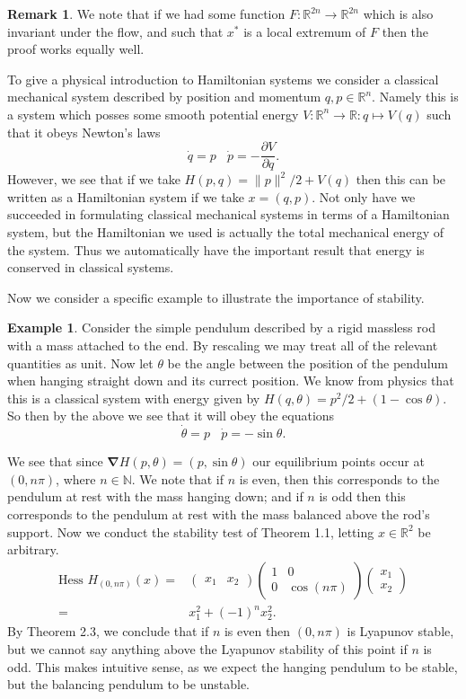 \documentclass[psamsfonts,12pt]{amsart}
\newcommand\0{\mathbf{0}}
\newcommand\grad{\boldsymbol{\nabla}}
\theoremstyle{plain}
\theoremstyle{definition}
\newtheorem{ex}[thm]{Example} %
\newtheorem{rmk}[thm]{Remark}
\newcommand{\bbN}{\mathbb{N}}
\newcommand{\bbR}{\mathbb{R}}
\begin{document}
\begin{rmk}
We note that if we had some function $F \colon \bbR^{2n}\rightarrow \bbR^{2n}$ which is also invariant under the flow, and such that $x^*$ is a local extremum of $F$ then the proof works equally well.
\end{rmk}

To give a physical introduction to Hamiltonian systems we consider a classical mechanical system described by position and momentum $q,p\in \bbR^n$.  Namely this is a system which posses some smooth potential energy $V\colon \bbR^n\rightarrow \bbR \colon q\mapsto V(q)$ such that it obeys Newton's laws
\[
\dot{q}=p \ \  \ \ \dot{p}=-\frac{\partial V}{\partial q}.
\]
However, we see that if we take $H(p,q)=\|p\|^2/2+V(q)$ then this can be written as a Hamiltonian system if we take $x=(q,p)$.  Not only have we succeeded in formulating classical mechanical systems in terms of a Hamiltonian system, but the Hamiltonian we used is actually the total mechanical energy of the system.  Thus we automatically have the important result that energy is conserved in classical systems.

Now we consider a specific example to illustrate the importance of stability.

\begin{ex}
Consider the simple pendulum described by a rigid massless rod with a mass attached to the end.  By rescaling we may treat all of the relevant quantities as unit.  Now let $\theta$ be the angle between the position of the pendulum when hanging straight down and its currect position.  We know from physics that this is a classical system with energy given by $H(q,\theta)=p^2/2+(1-\cos\theta)$.  So then by the above we see that it will obey the equations
\[
\dot{\theta}=p \ \  \ \ \dot{p}=-\sin\theta.
\]

We see that since $\grad H(p,\theta) = (p, \sin\theta)$ our equilibrium points occur at $(0, n\pi)$, where $n\in \bbN$.  We note that if $n$ is even, then this corresponds to the pendulum at rest with the mass hanging down; and if $n$ is odd then this corresponds to the pendulum at rest with the mass balanced above the rod's support.  Now we conduct the stability test of Theorem 1.1, letting $x\in \bbR^2$ be arbitrary.
\begin{align*}
\text{Hess } H_{(0,n\pi)}(x) =& \begin{pmatrix} x_1& x_2\end{pmatrix} \begin{pmatrix} 1& 0\\ 0& \cos(n\pi)\end{pmatrix} \begin{pmatrix} x_1\\ x_2\end{pmatrix}\\
=& x_1^2+ (-1)^n x_2^2.
\end{align*}
By Theorem 2.3, we conclude that if $n$ is even then $(0,n\pi )$ is Lyapunov stable, but we cannot say anything above the Lyapunov stability of this point if $n$ is odd.  This makes intuitive sense, as we expect the hanging pendulum to be stable, but the balancing pendulum to be unstable.
\end{ex}
\end{document}
